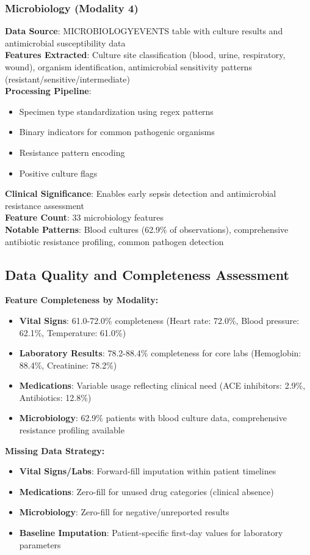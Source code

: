 \documentclass[11pt]{article}
\begin{document}
\subsubsection{Microbiology (Modality 4)}
\textbf{Data Source}: MICROBIOLOGYEVENTS table with culture results and antimicrobial susceptibility data
\\
\textbf{Features Extracted}: Culture site classification (blood, urine, respiratory, wound), organism identification, antimicrobial sensitivity patterns (resistant/sensitive/intermediate)
\\
\textbf{Processing Pipeline}:
\begin{itemize}
    \item Specimen type standardization using regex patterns
    \item Binary indicators for common pathogenic organisms
    \item Resistance pattern encoding
    \item Positive culture flags
\end{itemize}
\textbf{Clinical Significance}: Enables early sepsis detection and antimicrobial resistance assessment
\\
\textbf{Feature Count}: 33 microbiology features
\\
\textbf{Notable Patterns}: Blood cultures (62.9\% of observations), comprehensive antibiotic resistance profiling, common pathogen detection

\subsection{Data Quality and Completeness Assessment}

\textbf{Feature Completeness by Modality:}
\begin{itemize}
    \item \textbf{Vital Signs}: 61.0-72.0\% completeness (Heart rate: 72.0\%, Blood pressure: 62.1\%, Temperature: 61.0\%)
    \item \textbf{Laboratory Results}: 78.2-88.4\% completeness for core labs (Hemoglobin: 88.4\%, Creatinine: 78.2\%)  
    \item \textbf{Medications}: Variable usage reflecting clinical need (ACE inhibitors: 2.9\%, Antibiotics: 12.8\%)
    \item \textbf{Microbiology}: 62.9\% patients with blood culture data, comprehensive resistance profiling available
\end{itemize}

\textbf{Missing Data Strategy:}
\begin{itemize}
    \item \textbf{Vital Signs/Labs}: Forward-fill imputation within patient timelines
    \item \textbf{Medications}: Zero-fill for unused drug categories (clinical absence)
    \item \textbf{Microbiology}: Zero-fill for negative/unreported results
    \item \textbf{Baseline Imputation}: Patient-specific first-day values for laboratory parameters
\end{itemize}
\end{document}
